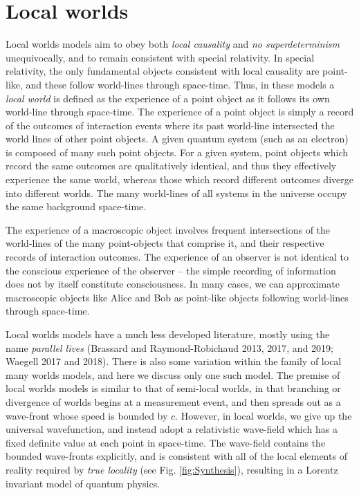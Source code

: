 \documentclass[a4paper]{article}
\begin{document}
\section{Local worlds} \label{LocalWorlds}

Local worlds models aim to obey both \textit{local causality} and \textit{no superdeterminism} unequivocally, and to remain consistent with special relativity. In special relativity, the only fundamental objects consistent with local causality are point-like, and these follow world-lines through space-time. Thus, in these models a \textit{local world} is defined as the experience of a point object as it follows its own world-line through space-time.  The experience of a point object is simply a record of the outcomes of interaction events where its past world-line intersected the world lines of other point objects. A given quantum system (such as an electron) is composed of many such point objects. For a given system, point objects which record the same outcomes are qualitatively identical, and thus they effectively experience the same world, whereas those which record different outcomes diverge into different worlds.  The many world-lines of all systems in the universe occupy the same background space-time. 

The experience of a macroscopic object involves frequent intersections of the world-lines of the many point-objects that comprise it, and their respective records of interaction outcomes. The experience of an observer is not identical to the conscious experience of the observer -- the simple recording of information does not by itself constitute consciousness.  In many cases, we can approximate macroscopic objects like Alice and Bob as point-like objects following world-lines through space-time.

Local worlds models have a much less developed literature, mostly using the name \emph{parallel lives} (Brassard and Raymond-Robichaud 2013, 2017, and 2019; Waegell 2017 and 2018).  There is also some variation within the family of local many worlds models, and here we discuss only one such model.  The premise of local worlds models is similar to that of semi-local worlds, in that branching or divergence of worlds begins at a measurement event, and then spreads out as a wave-front whose speed is bounded by $c$.  However, in local worlds, we give up the universal wavefunction, and instead adopt a relativistic wave-field which has a fixed definite value at each point in space-time.  The wave-field contains the bounded wave-fronts explicitly, and is consistent with all of the local elements of reality required by \textit{true locality} (see Fig. \ref{fig:Synthesis}), resulting in a Lorentz invariant model of quantum physics.  
\end{document}
